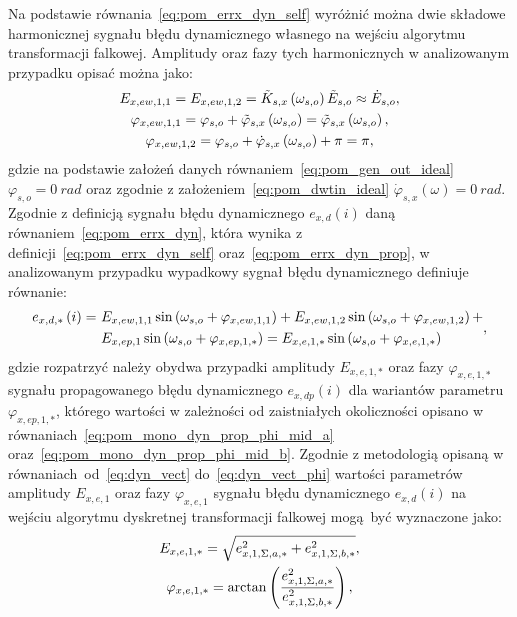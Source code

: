 Na podstawie równania~\eqref{eq:pom_errx_dyn_self} wyróżnić można dwie składowe harmonicznej sygnału błędu dynamicznego własnego na wejściu algorytmu transformacji falkowej. Amplitudy oraz fazy tych harmonicznych w analizowanym przypadku opisać można jako:
\begin{gather}
E_{x,ew,1,1} = E_{x,ew,1,2} = \tilde{K}_{s,x} \left(\omega_{s,o}\right) \tilde{E}_{s,o} \approx \dot{E}_{s,o} \label{eq:pom_mono_dyn_self_amp_mid}, \\
\varphi_{x,ew,1,1} = \varphi_{s,o} + \tilde{\varphi}_{s,x} \left(\omega_{s,o}\right) = \tilde{\varphi}_{s,x} \left(\omega_{s,o}\right) \label{eq:pom_mono_dyn_self_phi_mid_1}, \\
\varphi_{x,ew,1,2} = \varphi_{s,o} + \dot{\varphi}_{s,x} \left(\omega_{s,o}\right) + \pi = \pi \label{eq:pom_mono_dyn_self_phi_mid_2},
\end{gather}
gdzie na podstawie założeń danych równaniem~\eqref{eq:pom_gen_out_ideal} $\varphi_{s,o} = \qty{0}{rad}$ oraz zgodnie z założeniem~\eqref{eq:pom_dwtin_ideal} $\dot{\varphi}_{s,x}(\omega) = \qty{0}{rad}$. Zgodnie z definicją sygnału błędu dynamicznego $e_{x,d}(i)$ daną równaniem~\eqref{eq:pom_errx_dyn}, która wynika z definicji~\eqref{eq:pom_errx_dyn_self} oraz~\eqref{eq:pom_errx_dyn_prop}, w analizowanym przypadku wypadkowy sygnał błędu dynamicznego definiuje równanie:
\begin{equation}
\begin{split}
e_{x,d,*} \left(i\right) =~
& E_{x,ew,1,1} \sin \left(\omega_{s,o} + \varphi_{x,ew,1,1}\right) + E_{x,ew,1,2} \sin \left(\omega_{s,o} + \varphi_{x,ew,1,2}\right) + \\
& E_{x,ep,1} \sin \left(\omega_{s,o} + \varphi_{x,ep,1,*}\right) = E_{x,e,1,*} \sin \left(\omega_{s,o} + \varphi_{x,e,1,*}\right)
\end{split}
\label{eq:pom_mono_dyn_sum_err_mid},
\end{equation}
gdzie rozpatrzyć należy obydwa przypadki amplitudy $E_{x,e,1,*}$ oraz fazy $\varphi_{x,e,1,*}$ sygnału propagowanego błędu dynamicznego $e_{x,dp}(i)$ dla wariantów parametru $\varphi_{x,ep,1,*}$, którego wartości w zależności od zaistniałych okoliczności opisano w równaniach~\eqref{eq:pom_mono_dyn_prop_phi_mid_a} oraz~\eqref{eq:pom_mono_dyn_prop_phi_mid_b}. Zgodnie z metodologią opisaną w równaniach~od~\eqref{eq:dyn_vect} do~\eqref{eq:dyn_vect_phi} wartości parametrów amplitudy $E_{x,e,1}$ oraz fazy $\varphi_{x,e,1}$ sygnału błędu dynamicznego $e_{x,d}(i)$ na wejściu algorytmu dyskretnej transformacji falkowej mogą być wyznaczone jako:
\begin{gather}
E_{x,e,1,*} = \sqrt{e_{x,1,\Sigma,a,*}^{2} + e_{x,1,\Sigma,b,*}^{2}} \label{eq:pom_mono_dyn_sum_param_amp_mid}, \\
\varphi_{x,e,1,*} = \arctan \left(\frac{e_{x,1,\Sigma,a,*}^{2}}{e_{x,1,\Sigma,b,*}^{2}}\right) \label{eq:pom_mono_dyn_sum_param_phi_mid},
\end{gather}
